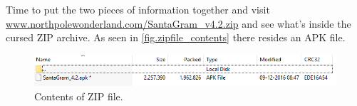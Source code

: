 \documentclass[writeup.tex]{subfiles}
\begin{document}
		Time to put the two pieces of information together and visit \url{www.northpolewonderland.com/SantaGram_v4.2.zip} and see what's inside the cursed ZIP archive. As seen in \autoref{fig.zipfile_contents} there resides an APK file.\\
		
		\begin{figure}[H]
			\centering
			\includegraphics[width=\linewidth]{screenshots/santagram_zip_contents}
			\caption{Contents of ZIP file.}
			\label{fig.zipfile_contents}
		\end{figure}
		
\end{document}
